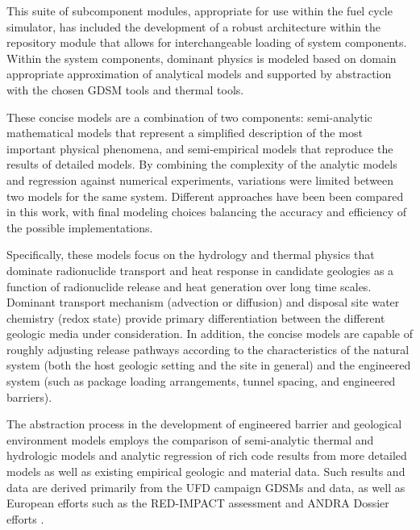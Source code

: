 This suite of subcomponent modules, appropriate for use within the \Cyclus fuel 
cycle simulator, has included the development of a robust architecture 
within the repository module that allows for interchangeable loading of 
system components.  Within the system components, dominant physics is 
modeled based on domain appropriate approximation of analytical models and 
supported by abstraction with the chosen \gls{GDSM} tools and thermal tools. 


These concise models are a combination of two components: 
semi-analytic mathematical models that represent a simplified description of 
the most important physical phenomena, and semi-empirical models that reproduce 
the results of detailed models.  By combining the complexity of the analytic 
models and regression against numerical experiments, variations were limited 
between two models for the same system.  Different approaches have been been 
compared in this work, with final modeling choices balancing the accuracy and 
efficiency of the possible implementations.  


Specifically, these models focus on the hydrology and thermal 
physics that dominate radionuclide transport and heat response in candidate 
geologies as a function of radionuclide release and heat generation over long 
time scales. Dominant transport mechanism (advection or 
diffusion) and disposal site water chemistry (redox state) provide primary 
differentiation between the different geologic media under consideration. In 
addition, the concise models are capable of roughly adjusting release 
pathways according to the characteristics of the natural system (both the host 
geologic setting and the site in general) and the engineered system (such as package 
loading arrangements, tunnel spacing, and engineered barriers).


The abstraction process in the development of engineered barrier and  geological 
environment models employs the comparison of semi-analytic thermal and 
hydrologic models and analytic regression of rich code results from more 
detailed models as well as existing empirical geologic and material data. 
Such results and data are derived primarily from the \gls{UFD} campaign 
\glspl{GDSM} and data, as well as European efforts such as the RED-IMPACT 
assessment and \gls{ANDRA} Dossier efforts \cite{von_lensa_red-impact_2008, 
andra_argile:_2005, clayton_generic_2011} . 

